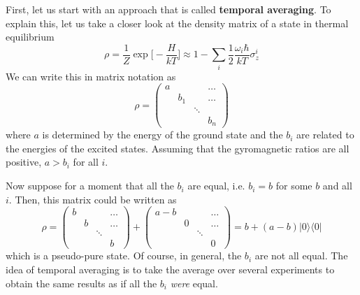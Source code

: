 \documentclass[a4paper, draft]{article}
\theoremstyle{own}
\theoremstyle{remark}
\begin{document}
First, let us start with an approach that is called {\bf temporal averaging}. To explain this, let us take a closer look at the density matrix of a state in thermal equilibrium
$$
\rho = \frac{1}{Z} \exp \big[  - \frac{H}{kT} \big] \approx 1 - \sum_i \frac{1}{2} \frac{\omega_i \hbar}{kT} \sigma_z^i
$$
We can write this in matrix notation as 
$$
\rho = \begin{pmatrix}
a & &  &\dots  \\
& b_1 & & \dots \\
& & \ddots & \\
& &  & b_n 
\end{pmatrix}
$$
where $a$ is determined by the energy of the ground state and the $b_i$ are related to the energies of the excited states. Assuming that the gyromagnetic ratios are all positive, $a > b_i$ for all $i$. 

Now suppose for a moment that all the $b_i$ are equal, i.e. $b_i = b$ for some $b$ and all $i$. Then, this matrix could be written as
$$
\rho = \begin{pmatrix}
b & &  &\dots  \\
& b & & \dots \\
& & \ddots & \\
& &  & b 
\end{pmatrix} 
+
\begin{pmatrix}
a - b & &  &\dots  \\
& 0 & & \dots \\
& & \ddots & \\
& &  & 0 
\end{pmatrix} = b + (a-b) |0 \rangle \langle 0|
$$
which is a pseudo-pure state. Of course, in general, the $b_i$ are not all equal. The idea of temporal averaging is to take the average over several experiments to obtain the same results as if all the $b_i$ \emph{were} equal. 
\end{document}
